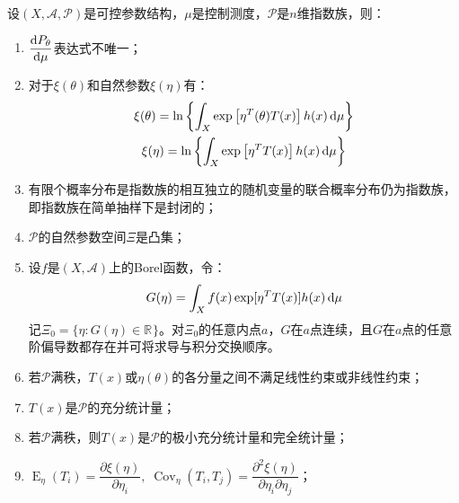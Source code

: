 \begin{property}\label{prop:ExponentialFamily}
	设$(X,\mathscr{A},\mathscr{P})$是可控参数结构，$\mu$是控制测度，$\mathscr{P}$是$n$维指数族，则：
	\begin{enumerate}
		\item $\dfrac{\mathop{}\!\mathrm{d} P_{\theta}}{\mathop{}\!\mathrm{d}\mu}$表达式不唯一；
		\item 对于$\xi(\theta)$和自然参数$\xi(\eta)$有：
		\begin{gather*}
			\xi(\theta)=\ln\left\{\int_{X}\exp\left[\eta^T(\theta)T(x)\right]h(x)\mathop{}\!\mathrm{d}\mu\right\} \\
			\xi(\eta)=\ln\left\{\int_{X}\exp\left[\eta^TT(x)\right]h(x)\mathop{}\!\mathrm{d}\mu\right\}
		\end{gather*}
		\item 有限个概率分布是指数族的相互独立的随机变量的联合概率分布仍为指数族，即指数族在简单抽样下是封闭的；
		\item $\mathscr{P}$的自然参数空间$\Xi$是凸集；
		\item 设$f$是$(X,\mathscr{A})$上的Borel函数，令：
		\begin{equation*}
			G(\eta)=\int_{X}f(x)\exp[\eta^TT(x)]h(x)\mathop{}\!\mathrm{d}\mu
		\end{equation*}
		记$\Xi_0=\{\eta:G(\eta)\in\mathbb{R}^{}\}$。对$\Xi_0$的任意内点$a$，$G$在$a$点连续，且$G$在$a$点的任意阶偏导数都存在并可将求导与积分交换顺序。
		\item 若$\mathscr{P}$满秩，$T(x)$或$\eta(\theta)$的各分量之间不满足线性约束或非线性约束；
		\item $T(x)$是$\mathscr{P}$的充分统计量；
		\item 若$\mathscr{P}$满秩，则$T(x)$是$\mathscr{P}$的极小充分统计量和完全统计量；
		\item $\operatorname{E}_{\eta}(T_i)=\dfrac{\partial\xi(\eta)}{\partial\eta_i},\;\operatorname{Cov}_{\eta}(T_i,T_j)=\dfrac{\partial^2\xi(\eta)}{\partial\eta_i\partial\eta_j}$；
	\end{enumerate}
\end{property}
